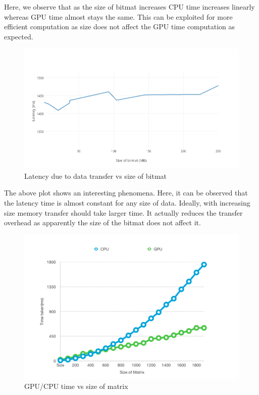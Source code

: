\documentclass{article}
\begin{document}
Here, we observe that as the size of bitmat increases CPU time increases linearly whereas GPU time almost stays the same. This can be exploited for more efficient computation as size does not affect the GPU time computation as expected.
\pagebreak
\begin{figure}[ht]
        \includegraphics[width=.75\textwidth]{latency_vs_size.png}
        \caption{Latency due to data transfer vs size of bitmat}
        \centering
\end{figure}

The above plot shows an interesting phenomena. Here, it can be observed that the latency time is almost constant for any size of data. Ideally, with increasing size memory transfer should take larger time. It actually reduces the transfer overhead as apparently the size of the bitmat does not affect it.

\begin{figure}[ht]
        \includegraphics[width=.75\textwidth]{unfold.png}
        \caption{GPU/CPU time vs size of matrix}
        \centering
\end{figure}
\end{document}

